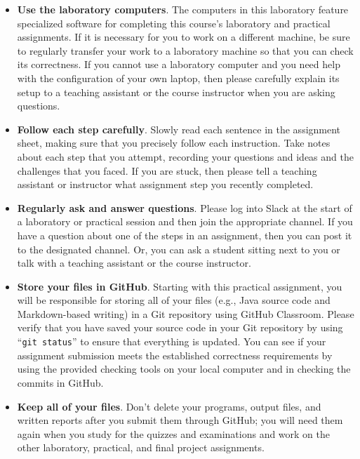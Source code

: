 \documentclass[11pt]{article}
\newcommand{\command}[1]{``\lstinline{#1}''}
\begin{document}
\begin{itemize}
  \setlength{\itemsep}{0pt}

\item {\bf Use the laboratory computers}. The computers in this laboratory feature specialized software for completing
  this course's laboratory and practical assignments. If it is necessary for you to work on a different machine, be sure
  to regularly transfer your work to a laboratory machine so that you can check its correctness. If you cannot use a
  laboratory computer and you need help with the configuration of your own laptop, then please carefully explain its
  setup to a teaching assistant or the course instructor when you are asking questions.

\item {\bf Follow each step carefully}. Slowly read each sentence in the assignment sheet, making sure that you
  precisely follow each instruction. Take notes about each step that you attempt, recording your questions and ideas and
  the challenges that you faced. If you are stuck, then please tell a teaching assistant or instructor what assignment
  step you recently completed.

\item {\bf Regularly ask and answer questions}. Please log into Slack at the start of a laboratory or practical session
  and then join the appropriate channel. If you have a question about one of the steps in an assignment, then you can
  post it to the designated channel. Or, you can ask a student sitting next to you or talk with a teaching assistant or
  the course instructor.

\item {\bf Store your files in GitHub}. Starting with this practical assignment, you will be responsible for storing
  all of your files (e.g., Java source code and Markdown-based writing) in a Git repository using GitHub Classroom.
  Please verify that you have saved your source code in your Git repository by using \command{git status} to ensure that
  everything is updated. You can see if your assignment submission meets the established correctness requirements by
  using the provided checking tools on your local computer and in checking the commits in GitHub.

\item {\bf Keep all of your files}. Don't delete your programs, output files, and written reports after you submit them
  through GitHub; you will need them again when you study for the quizzes and examinations and work on the other
  laboratory, practical, and final project assignments.


\end{itemize}
\end{document}
